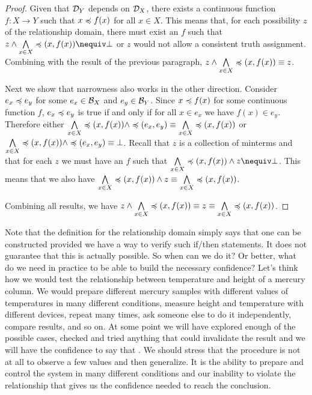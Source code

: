 \documentclass[11pt,letterpaper,fleqn]{memoir} %
\begin{document}
\begin{mathSection}
\begin{proof}
	Given that $\mathcal{D}_Y$ depends on $\mathcal{D}_X$, there exists a continuous function $f : X \to Y$ such that $x \preccurlyeq f(x)$ for all $x \in X$. This means that, for each possibility $z$ of the relationship domain, there must exist an $f$ such that $z \AND \bigAND\limits_{x\in X} \narrower(x,f(x)) \nequiv \contradiction$ or $z$ would not allow a consistent truth assignment. Combining with the result of the previous paragraph, $z \wedge \bigwedge\limits_{x\in X} \preccurlyeq(x,f(x)) \equiv z$.
	
	Next we show that narrowness also works in the other direction. Consider $e_x \preccurlyeq e_y$ for some $e_x \in \mathcal{B}_X$ and $e_y \in \mathcal{B}_Y$. Since $x \preccurlyeq f(x)$ for some continuous function $f$, $e_x \preccurlyeq e_y$ is true if and only if for all $x \in e_x$ we have $f(x) \in e_y$. Therefore either $\bigwedge\limits_{x\in X} \preccurlyeq(x,f(x)) \wedge \preccurlyeq(e_x, e_y) \equiv \bigwedge\limits_{x\in X} \preccurlyeq(x,f(x))$ or $\bigwedge\limits_{x\in X} \preccurlyeq(x,f(x)) \wedge \preccurlyeq(e_x, e_y) \equiv \bot$. Recall that $z$ is a collection of minterms and that for each $z$ we must have an $f$ such that $\bigAND\limits_{x\in X} \narrower(x,f(x)) \AND z \nequiv \contradiction$. This means that we also have $\bigwedge\limits_{x\in X} \preccurlyeq(x,f(x)) \wedge z \equiv \bigwedge\limits_{x\in X} \preccurlyeq(x,f(x))$.
	
	Combining all results, we have $z \wedge \bigwedge\limits_{x\in X} \preccurlyeq(x,f(x)) \equiv z \equiv \bigwedge\limits_{x\in X} \preccurlyeq(x,f(x))$.
\end{proof}
\end{mathSection}

Note that the definition for the relationship domain simply says that one can be constructed provided we have a way to verify such if/then statements. It does not guarantee that this is actually possible. So when can we do it? Or better, what do we need in practice to be able to build the necessary confidence? Let's think how we would test the relationship between temperature and height of a mercury column. We would prepare different mercury samples with different values of temperatures in many different conditions, measure height and temperature with different devices, repeat many times, ask someone else to do it independently, compare results, and so on. At some point we will have explored enough of the possible cases, checked and tried anything that could invalidate the result and we will have the confidence to say that . We should stress that the procedure is not at all to observe a few values and then generalize. It is the ability to prepare and control the system in many different conditions and our inability to violate the relationship that gives us the confidence needed to reach the conclusion.
\end{document}
